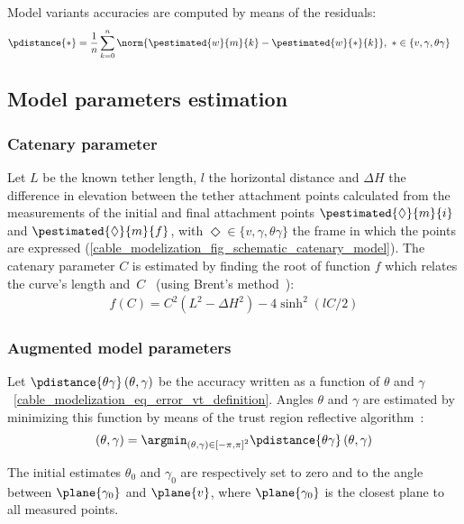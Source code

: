 Model variants accuracies are computed by means of the residuals:
\begin{align}
	\pdistance{\ast} & = \frac{1}{n}\sum_{k=0}^{n}{\norm{\pestimated{w}{m}{k} -\pestimated{w}{\ast}{k}}}, ~
	\ast\in \left\{v, \gamma, \theta\gamma \right\}
	\label{cable_modelization_eq_error_vt_definition}
\end{align}

\subsection{Model parameters estimation}\label{cable_modelization_subsec_estimation}
\subsubsection{Catenary parameter}

Let $L$ be the known tether length, $l$ the horizontal distance and $\Delta H$ the difference in
elevation between the tether attachment points calculated from the measurements of the initial and
final attachment points $\pestimated{\Diamond}{m}{i}$ and $\pestimated{\Diamond}{m}{f}$, with
$\Diamond\in\{v, \gamma, \theta\gamma\}$ the frame in which the points are expressed
(\cref{cable_modelization_fig_schematic_catenary_model}). The catenary parameter $C$ is estimated
by finding the root of function $f$ which relates the curve's length and~$C$~\cite{laranjeira2020a}
(using Brent's method~\cite{brent2013algorithms}):
\begin{align*}
	f(C)=C^2 \left(L^2 - \Delta H^2\right) - 4  \sinh^2(lC/2)
\end{align*}

\subsubsection{Augmented model parameters}

Let $\pdistance{\theta\gamma}\left(\theta, \gamma\right)$ be the accuracy written as a function of
$\theta$ and $\gamma$~\cref{cable_modelization_eq_error_vt_definition}. Angles $\theta$ and
$\gamma$ are estimated by minimizing this function by means of the trust region reflective
algorithm~\cite{Branch1999TIR}:
\begin{align*}
	(\theta, \gamma) = \argmin_{(\theta, \gamma)\in\left[-\pi,\pi\right]^2} \pdistance{\theta\gamma}\left(\theta, \gamma\right)
\end{align*}

The initial estimates $\theta_0$ and $\gamma_0$ are respectively set to zero and to the angle
between $\plane{\gamma_0}$ and $\plane{v}$, where $\plane{\gamma_0}$ is the closest plane to all
measured points.


